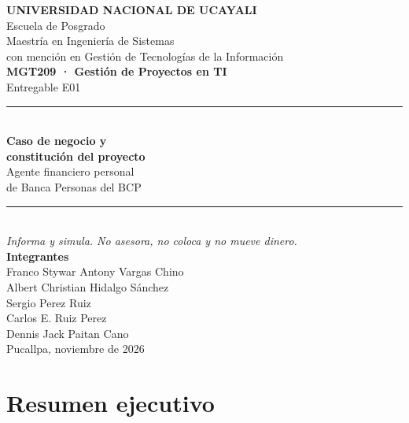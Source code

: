 \documentclass[11pt,a4paper]{article}
\begin{document}
\begin{titlepage}
\centering
\vspace*{0.6cm}
{\color{bcp}\large\bfseries UNIVERSIDAD NACIONAL DE UCAYALI}\\[0.4em]
{\color{bcp}\normalsize Escuela de Posgrado}\\[0.2em]
{\color{bcp}\normalsize Maestría en Ingeniería de Sistemas}\\[0.15em]
{\color{bcp}\normalsize con mención en Gestión de Tecnologías de la Información}\\[2.0cm]

{\color{cobre}\bfseries MGT209 · Gestión de Proyectos en TI}\\[0.3em]
{\color{cobre}Entregable E01}\\[1.4cm]

{\color{bcp}\rule{0.7\textwidth}{0.8pt}}\\[0.9em]
{\color{bcp}\fontsize{24}{30}\selectfont\bfseries Caso de negocio y\\[0.2em] constitución del proyecto}\\[0.9em]
{\Large Agente financiero personal\\[0.2em] de Banca Personas del BCP}\\[0.7em]
{\color{bcp}\rule{0.7\textwidth}{0.8pt}}\\[0.9em]
{\itshape Informa y simula. No asesora, no coloca y no mueve dinero.}\\[2.4cm]

{\color{bcp}\bfseries Integrantes}\\[0.5em]
Franco Stywar Antony Vargas Chino\\
Albert Christian Hidalgo Sánchez\\
Sergio Perez Ruiz\\
Carlos E. Ruiz Perez\\
Dennis Jack Paitan Cano\\[2.0cm]

\vfill
{Pucallpa, noviembre de 2026}
\end{titlepage}

\setcounter{page}{2}
{
\tableofcontents
\vspace{1.2em}
\listoftables}
\clearpage

\section*{Resumen ejecutivo}
\end{document}
